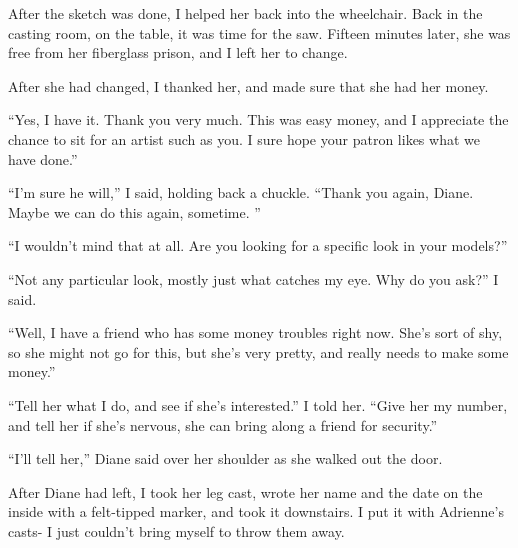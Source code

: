 After the sketch was done, I helped her back into the wheelchair. Back in the casting room, on
the table, it was time for the saw. Fifteen minutes later, she was free from her fiberglass
prison, and I left her to change.

After she had changed, I thanked her, and made sure that she had her money.

``Yes, I have it. Thank you very much. This was easy money, and I appreciate the chance to sit
for an artist such as you. I sure hope your patron likes what we have done.''

``I'm sure he will,'' I said, holding back a chuckle. ``Thank you again, Diane. Maybe we can do
this again, sometime. ''

``I wouldn't mind that at all. Are you looking for a specific look in your models?''

``Not any particular look, mostly just what catches my eye. Why do you ask?'' I said.

``Well, I have a friend who has some money troubles right now. She's sort of shy, so she might
not go for this, but she's very pretty, and really needs to make some money.''

``Tell her what I do, and see if she's interested.'' I told her. ``Give her my number, and tell
her if she's nervous, she can bring along a friend for security.''

``I'll tell her,'' Diane said over her shoulder as she walked out the door.

After Diane had left, I took her leg cast, wrote her name and the date on the inside with a
felt-tipped marker, and took it downstairs. I put it with Adrienne's casts- I just couldn't
bring myself to throw them away.
